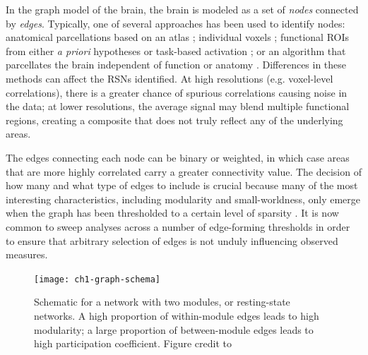 In the graph model of the brain, the brain is modeled as a set of \textit{nodes} connected by \textit{edges}. Typically, one of several approaches has been used to identify nodes: anatomical parcellations based on an atlas \citep{Supekar2008, Liu2008, Lynall2010}; individual voxels \citep{Fair2007}; functional ROIs from either \textit{a priori} hypotheses or task-based activation \citep{VandenHeuvel2010}; or an algorithm that parcellates the brain independent of function or anatomy \citep{Goni2014}. Differences in these methods can affect the RSNs identified. At high resolutions (e.g. voxel-level correlations), there is a greater chance of spurious correlations causing noise in the data; at lower resolutions, the average signal may blend multiple functional regions, creating a composite that does not truly reflect any of the underlying areas. 

The edges connecting each node can be binary or weighted, in which case areas that are more highly correlated carry a greater connectivity value. The decision of how many and what type of edges to include is crucial because many of the most interesting characteristics, including modularity and small-worldness, only emerge when the graph has been thresholded to a certain level of sparsity \citep{Moussa2012}. It is now common to sweep analyses across a number of edge-forming thresholds in order to ensure that arbitrary selection of edges is not unduly influencing observed measures.

\begin{figure}[t]
    \centering
    \texttt{[image: ch1-graph-schema]}
    \caption[Schematic for a network with two modules]{Schematic for a network with two modules, or resting-state networks. A high proportion of within-module edges leads to high modularity; a large proportion of between-module edges leads to high participation coefficient. Figure credit to \cite{Godwin2016}}
    \label{fig:ch1-graph-schema}
\end{figure}

